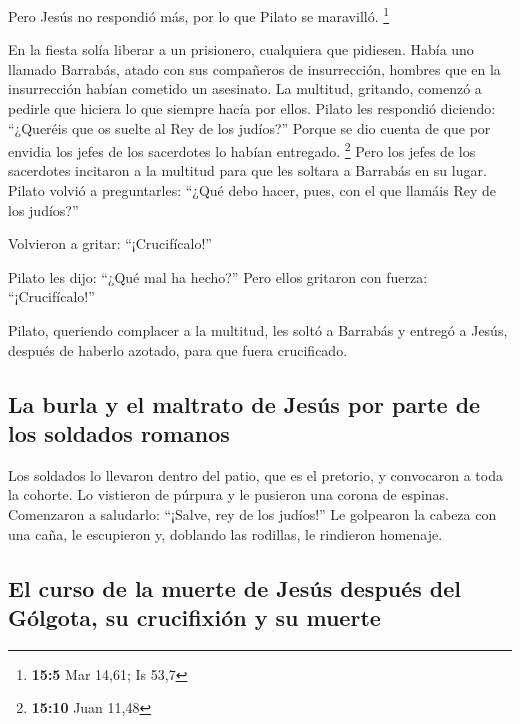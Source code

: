  Pero Jesús no respondió más, por lo que Pilato se
maravilló. \footnote{\textbf{15:5} Mar 14,61; Is 53,7}

 En la fiesta solía liberar a un prisionero, cualquiera
que pidiesen.  Había uno llamado Barrabás, atado con sus
compañeros de insurrección, hombres que en la insurrección habían
cometido un asesinato.  La multitud, gritando, comenzó a
pedirle que hiciera lo que siempre hacía por ellos. 
Pilato les respondió diciendo: ``¿Queréis que os suelte al Rey de los
judíos?''  Porque se dio cuenta de que por envidia los
jefes de los sacerdotes lo habían entregado. \footnote{\textbf{15:10}
  Juan 11,48}  Pero los jefes de los sacerdotes incitaron
a la multitud para que les soltara a Barrabás en su lugar.
 Pilato volvió a preguntarles: ``¿Qué debo hacer, pues,
con el que llamáis Rey de los judíos?''

 Volvieron a gritar: ``¡Crucifícalo!''

 Pilato les dijo: ``¿Qué mal ha hecho?'' Pero ellos
gritaron con fuerza: ``¡Crucifícalo!''

 Pilato, queriendo complacer a la multitud, les soltó a
Barrabás y entregó a Jesús, después de haberlo azotado, para que fuera
crucificado.

\hypertarget{la-burla-y-el-maltrato-de-jesuxfas-por-parte-de-los-soldados-romanos}{%
\subsection{La burla y el maltrato de Jesús por parte de los soldados
romanos}\label{la-burla-y-el-maltrato-de-jesuxfas-por-parte-de-los-soldados-romanos}}

 Los soldados lo llevaron dentro del patio, que es el
pretorio, y convocaron a toda la cohorte.  Lo vistieron
de púrpura y le pusieron una corona de espinas. 
Comenzaron a saludarlo: ``¡Salve, rey de los judíos!'' 
Le golpearon la cabeza con una caña, le escupieron y, doblando las
rodillas, le rindieron homenaje.

\hypertarget{el-curso-de-la-muerte-de-jesuxfas-despuuxe9s-del-guxf3lgota-su-crucifixiuxf3n-y-su-muerte}{%
\subsection{El curso de la muerte de Jesús después del Gólgota, su
crucifixión y su
muerte}\label{el-curso-de-la-muerte-de-jesuxfas-despuuxe9s-del-guxf3lgota-su-crucifixiuxf3n-y-su-muerte}}

